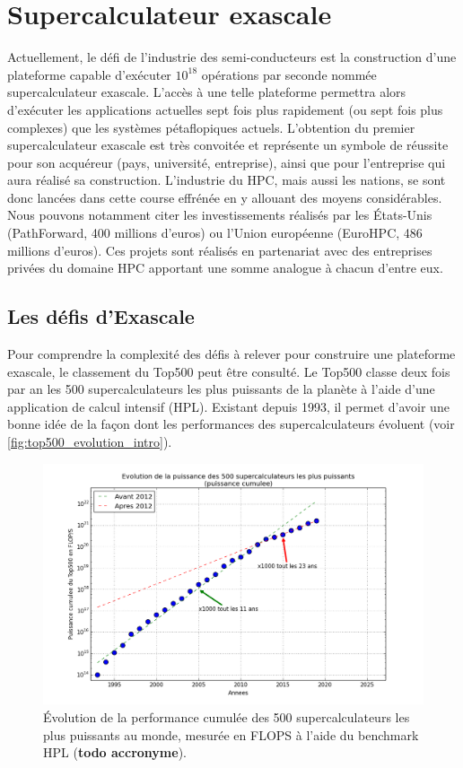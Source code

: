 \section{Supercalculateur exascale}

Actuellement, le défi de l'industrie des semi-conducteurs est la construction d'une plateforme capable d'exécuter $10^{18}$ opérations par seconde nommée supercalculateur exascale. L'accès à une telle plateforme permettra alors d'exécuter les applications actuelles sept fois plus rapidement (ou sept fois plus complexes) que les systèmes pétaflopiques actuels. L'obtention du premier supercalculateur exascale est très convoitée et représente un symbole de réussite pour son acquéreur (pays, université, entreprise), ainsi que pour l'entreprise qui aura réalisé sa construction. L'industrie du HPC, mais aussi les nations, se sont donc lancées dans cette course effrénée en y allouant des moyens considérables. Nous pouvons notamment citer les investissements réalisés par les États-Unis (PathForward, 400 millions d'euros) ou l'Union européenne  (EuroHPC, 486 millions d'euros). Ces projets sont réalisés en partenariat avec des entreprises privées du domaine HPC apportant une somme analogue à chacun d'entre eux.


    \subsection{Les défis d'Exascale}

        Pour comprendre la complexité des défis à relever pour construire une plateforme exascale, le classement du Top500 peut être consulté. Le Top500 classe deux fois par an les 500 supercalculateurs les plus puissants de la planète à l'aide d'une application de calcul intensif (HPL). Existant depuis 1993, il permet d'avoir une bonne idée de la façon dont les performances des supercalculateurs évoluent (voir \autoref{fig:top500_evolution_intro}).
        
        
        \begin{figure}[b!]
            \center
            \includegraphics[width=14cm]{images/top500_evolution.png}
            \caption{\label{fig:top500_evolution_intro} Évolution de la performance cumulée des 500 supercalculateurs les plus puissants au monde, mesurée en FLOPS à l'aide du benchmark HPL (\textbf{todo accronyme}).}
        \end{figure}
        
